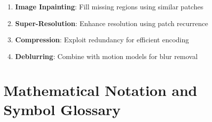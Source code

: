 \documentclass[12pt]{article}
\begin{document}
\begin{enumerate}
    \item \textbf{Image Inpainting}: Fill missing regions using similar patches
    \item \textbf{Super-Resolution}: Enhance resolution using patch recurrence
    \item \textbf{Compression}: Exploit redundancy for efficient encoding
    \item \textbf{Deblurring}: Combine with motion models for blur removal
\end{enumerate}

\newpage

\section{Mathematical Notation and Symbol Glossary}
\label{sec:notation}
\end{document}
